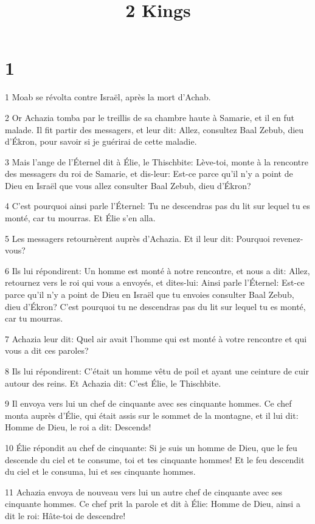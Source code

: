 

\title{2 Kings}


\chapter{1}

\par 1 Moab se révolta contre Israël, après la mort d'Achab.
\par 2 Or Achazia tomba par le treillis de sa chambre haute à Samarie, et il en fut malade. Il fit partir des messagers, et leur dit: Allez, consultez Baal Zebub, dieu d'Ékron, pour savoir si je guérirai de cette maladie.
\par 3 Mais l'ange de l'Éternel dit à Élie, le Thischbite: Lève-toi, monte à la rencontre des messagers du roi de Samarie, et dis-leur: Est-ce parce qu'il n'y a point de Dieu en Israël que vous allez consulter Baal Zebub, dieu d'Ékron?
\par 4 C'est pourquoi ainsi parle l'Éternel: Tu ne descendras pas du lit sur lequel tu es monté, car tu mourras. Et Élie s'en alla.
\par 5 Les messagers retournèrent auprès d'Achazia. Et il leur dit: Pourquoi revenez-vous?
\par 6 Ils lui répondirent: Un homme est monté à notre rencontre, et nous a dit: Allez, retournez vers le roi qui vous a envoyés, et dites-lui: Ainsi parle l'Éternel: Est-ce parce qu'il n'y a point de Dieu en Israël que tu envoies consulter Baal Zebub, dieu d'Ékron? C'est pourquoi tu ne descendras pas du lit sur lequel tu es monté, car tu mourras.
\par 7 Achazia leur dit: Quel air avait l'homme qui est monté à votre rencontre et qui vous a dit ces paroles?
\par 8 Ils lui répondirent: C'était un homme vêtu de poil et ayant une ceinture de cuir autour des reins. Et Achazia dit: C'est Élie, le Thischbite.
\par 9 Il envoya vers lui un chef de cinquante avec ses cinquante hommes. Ce chef monta auprès d'Élie, qui était assis sur le sommet de la montagne, et il lui dit: Homme de Dieu, le roi a dit: Descends!
\par 10 Élie répondit au chef de cinquante: Si je suis un homme de Dieu, que le feu descende du ciel et te consume, toi et tes cinquante hommes! Et le feu descendit du ciel et le consuma, lui et ses cinquante hommes.
\par 11 Achazia envoya de nouveau vers lui un autre chef de cinquante avec ses cinquante hommes. Ce chef prit la parole et dit à Élie: Homme de Dieu, ainsi a dit le roi: Hâte-toi de descendre!
